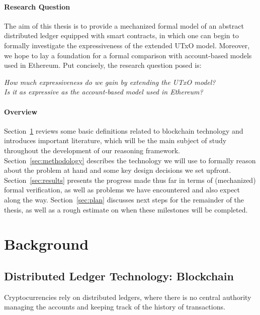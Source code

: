 \documentclass[acmsmall,nonacm=true,screen=true]{acmart}
\begin{document}
\paragraph{Research Question}
The aim of this thesis is to provide a mechanized formal model of an abstract distributed ledger equipped with
smart contracts, in which one can begin to formally investigate the expressiveness of the extended UTxO model.
Moreover, we hope to lay a foundation for a formal comparison with account-based
models used in Ethereum. Put concisely, the research question posed is:
\begin{displayquote}
	\textit{How much expressiveness do we gain by extending the UTxO model?} \\
	\textit{Is it as expressive as the account-based model used in Ethereum?}
\end{displayquote}

\paragraph{Overview}
Section~\ref{sec:background} reviews some basic definitions related to blockchain
technology and introduces important literature, which will be the main subject of study
throughout the development of our reasoning framework.
Section~\ref{sec:methodology} describes the technology we will use to formally reason
about the problem at hand and some key design decisions we set upfront.
Section~\ref{sec:results} presents the progress made thus far in terms of (mechanized) formal verification,
as well as problems we have encountered and also expect along the way.
Section~\ref{sec:plan} discusses next steps for the remainder of the thesis, as well as a rough estimate
on when these milestones will be completed.

\section{Background}
\label{sec:background}


\subsection{Distributed Ledger Technology: Blockchain} \label{subsec:dlt}
Cryptocurrencies rely on distributed ledgers, where there is no central authority managing the accounts
and keeping track of the history of transactions.
\end{document}
